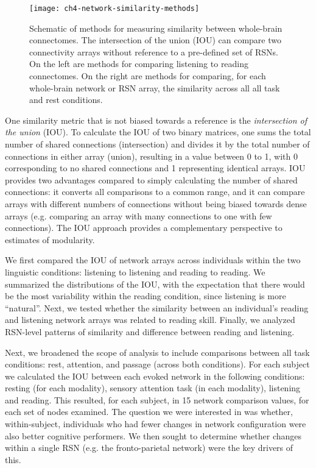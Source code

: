 \begin{figure}[t]
	\centering
	\texttt{[image: ch4-network-similarity-methods]}
    \caption[Methods for measuring similarity between whole-brain connectomes.]{Schematic of methods for measuring similarity between whole-brain connectomes. The intersection of the union (IOU) can compare two connectivity arrays without reference to a pre-defined set of RSNs. On the left are methods for comparing listening to reading connectomes. On the right are methods for comparing, for each whole-brain network or RSN array, the similarity across all all task and rest conditions.}
	\label{fig:ch4-network-similarity-methods}
\end{figure}

One similarity metric that is not biased towards a reference is the \textit{intersection of the union} (IOU). To calculate the IOU of two binary matrices, one sums the total number of shared connections (intersection) and divides it by the total number of connections in either array (union), resulting in a value between 0 to 1, with 0 corresponding to no shared connections and 1 representing identical arrays. IOU provides two advantages compared to simply calculating the number of shared connections: it converts all comparisons to a common range, and it can compare arrays with different numbers of connections without being biased towards dense arrays (e.g. comparing an array with many connections to one with few connections). The IOU approach provides a complementary perspective to estimates of modularity.

We first compared the IOU of network arrays across individuals within the two linguistic conditions: listening to listening and reading to reading. We summarized the distributions of the IOU, with the expectation that there would be the most variability within the reading condition, since listening is more ``natural''. Next, we tested whether the similarity between an individual's reading and listening network arrays was related to reading skill. Finally, we analyzed RSN-level patterns of similarity and difference between reading and listening. 

Next, we broadened the scope of analysis to include comparisons between all task conditions: rest, attention, and passage (across both conditions). For each subject we calculated the IOU between each evoked network in the following conditions: resting (for each modality), sensory attention task (in each modality), listening and reading. This resulted, for each subject, in 15 network comparison values, for each set of nodes examined. The question we were interested in was whether, within-subject, individuals who had fewer changes in network configuration were also better cognitive performers. We then sought to determine whether changes within a single RSN (e.g. the fronto-parietal network) were the key drivers of this. 


